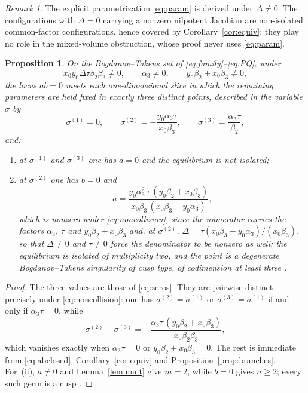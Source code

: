\documentclass[12pt]{article}
\theoremstyle{plain}
\newtheorem{proposition}[theorem]{Proposition}
\theoremstyle{definition}
\theoremstyle{remark}
\newtheorem{remark}[theorem]{Remark}
\begin{document}
	\begin{remark}\label{rem:deltazero}
		The explicit parametrization \eqref{eq:param} is derived under
		$\Delta\neq0$.  The configurations with $\Delta=0$ carrying a nonzero
		nilpotent Jacobian are non-isolated common-factor configurations, hence
		covered by Corollary~\ref{cor:equiv}; they play no role in the
		mixed-volume obstruction, whose proof never uses \eqref{eq:param}.
	\end{remark}
	
	\begin{proposition}\label{prop:classification}
		On the Bogdanov--Takens set of \eqref{eq:family}--\eqref{eq:PQ}, under
		\begin{equation}\label{eq:noncollision}
			x_{0}y_{0}\Delta\tau\beta_{2}\beta_{3}\neq0,
			\qquad
			\alpha_{3}\neq0,
			\qquad
			y_{0}\beta_{2}+x_{0}\beta_{3}\neq0,
		\end{equation}
		the locus $ab=0$ meets each one-dimensional slice in which the
		remaining parameters are held fixed in exactly three distinct points,
		described in the variable $\sigma$ by
		\[
		\sigma^{(1)}=0,
		\qquad
		\sigma^{(2)}=-\frac{y_{0}\alpha_{3}\tau}{x_{0}\beta_{3}},
		\qquad
		\sigma^{(3)}=\frac{\alpha_{3}\tau}{\beta_{2}} ,
		\]
		and:
		\begin{enumerate}[label=\rm(\roman*)]
			\item at $\sigma^{(1)}$ and $\sigma^{(3)}$ one has $a=0$ and the
			equilibrium is not isolated;
			\item at $\sigma^{(2)}$ one has $b=0$ and
			\[
			a=\frac{y_{0}\alpha_{3}^{2}\,\tau\,(y_{0}\beta_{2}+x_{0}\beta_{3})}
			{x_{0}\beta_{3}\,(x_{0}\beta_{3}-y_{0}\alpha_{3})},
			\]
			which is nonzero under \eqref{eq:noncollision}, since the numerator
			carries the factors $\alpha_{3}$, $\tau$ and
			$y_{0}\beta_{2}+x_{0}\beta_{3}$ and, at $\sigma^{(2)}$,
			$\Delta=\tau(x_{0}\beta_{3}-y_{0}\alpha_{3})/(x_{0}\beta_{3})$, so
			that $\Delta\neq0$ and $\tau\neq0$ force the denominator to be
			nonzero as well; the equilibrium is
			isolated of multiplicity two, and the point is a degenerate
			Bogdanov--Takens singularity of cusp type, of codimension at least
			three \cite{DRS1987,Kuznetsov2005}.
		\end{enumerate}
	\end{proposition}
	
	\begin{proof}
		The three values are those of \eqref{eq:zeros}.  They are pairwise
		distinct precisely under \eqref{eq:noncollision}: one has
		$\sigma^{(2)}=\sigma^{(1)}$ or $\sigma^{(3)}=\sigma^{(1)}$ if and only
		if $\alpha_{3}\tau=0$, while
		\[
		\sigma^{(2)}-\sigma^{(3)}
		=-\frac{\alpha_{3}\tau\,(y_{0}\beta_{2}+x_{0}\beta_{3})}
		{x_{0}\beta_{2}\beta_{3}} ,
		\]
		which vanishes exactly when $\alpha_{3}\tau=0$ or
		$y_{0}\beta_{2}+x_{0}\beta_{3}=0$.  The rest is immediate from
		\eqref{eq:abclosed}, Corollary~\ref{cor:equiv} and
		Proposition~\ref{prop:branches}.  For~(ii), $a\neq0$ and
		Lemma~\ref{lem:mult} give $m=2$, while $b=0$ gives $n\ge2$; every such
		germ is a cusp \cite{Dumortier1977,DRS1987,DLA2006}.
	\end{proof}
	
\end{document}
